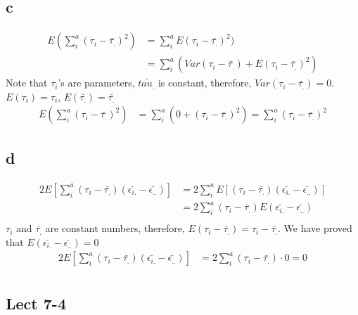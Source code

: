 \documentclass[11pt,letterpaper]{article}
\begin{document}
\subsection*{c}
\begin{align*}
E(\sum_i^a (\tau_i - \bar{\tau_.} )^2) &= \sum_i^a E(\tau_i - \bar{\tau_.} )^2) \\
&= \sum_i^a (Var(\tau_i - \bar{\tau_.}) + E(\tau_i - \bar{\tau_.} )^2)
\end{align*}
\noindent Note that $\tau_i$'s are parameters, $\bar{tau_.}$ is constant, therefore, $Var(\tau_i - \bar{\tau_.}) = 0$. $E(\tau_i) = \tau_i$, $ E( \bar{\tau_.}) = \bar{\tau_.}$
\begin{align*}
E(\sum_i^a (\tau_i - \bar{\tau_.} )^2) &= \sum_i^a (0 + (\tau_i - \bar{\tau_.})^2 ) = \sum_i^a (\tau_i - \bar{\tau_.})^2
\end{align*}

\subsection*{d}
\begin{align*}
2E[\sum_i^a (\tau_i - \bar{\tau_.}) (\bar{\epsilon_{i.}} - \bar{\epsilon_{..}} ) ] &= 2 \sum_i^a E [(\tau_i - \bar{\tau_.}) (\bar{\epsilon_{i.}} - \bar{\epsilon_{..}} )] \\
&= 2 \sum_i^a (\tau_i - \bar{\tau_.}) E( \bar{\epsilon_{i.}} - \bar{\epsilon_{..}} ) \\
\end{align*}
\noindent $\tau_i$ and $\bar{\tau_.}$ are constant numbers, therefore, $E(\tau_i - \bar{\tau_.}) = \tau_i - \bar{\tau_.}$. We have proved that $E(\bar{\epsilon_{i.}} - \bar{\epsilon_{..}}) = 0$
\begin{align*}
2E[\sum_i^a (\tau_i - \bar{\tau_.}) (\bar{\epsilon_{i.}} - \bar{\epsilon_{..}} ) ] &= 2 \sum_i^a (\tau_i - \bar{\tau_.}) \cdot 0 = 0 \\
\end{align*}

\subsection*{Lect 7-4}
\end{document}
